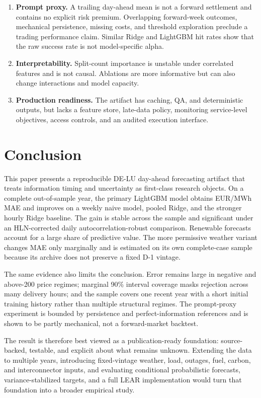 \documentclass[11pt]{article}
\begin{document}
\begin{enumerate}[leftmargin=*,itemsep=5pt]
  \item \textbf{Prompt proxy.}  A trailing day-ahead mean is not a forward
  settlement and contains no explicit risk premium.  Overlapping forward-week
  outcomes, mechanical persistence, missing costs, and threshold exploration
  preclude a trading performance claim. Similar Ridge and LightGBM hit rates
  show that the raw success rate is not model-specific alpha.

  \item \textbf{Interpretability.}  Split-count importance is unstable under
  correlated features and is not causal.  Ablations are more informative but
  can also change interactions and model capacity.

  \item \textbf{Production readiness.}  The artifact has caching, QA, and
  deterministic outputs, but lacks a feature store, late-data policy,
  monitoring service-level objectives, access controls, and an audited
  execution interface.
\end{enumerate}

\section{Conclusion}

This paper presents a reproducible DE-LU day-ahead forecasting artifact that
treats information timing and uncertainty as first-class research objects.
On a complete out-of-sample year, the primary LightGBM model obtains
\PrimaryMAE{} EUR/MWh MAE and improves on a weekly naive model, pooled Ridge,
and the stronger hourly Ridge baseline. The gain is stable across the sample
and significant under an HLN-corrected daily autocorrelation-robust
comparison. Renewable forecasts account for a large share of predictive value.
The more permissive weather variant changes MAE only marginally and is
estimated on its own complete-case sample because its archive does not
preserve a fixed D-1 vintage.

The same evidence also limits the conclusion. Error remains large in negative
and above-200 price regimes; marginal 90\% interval coverage masks rejection
across many delivery hours; and the sample covers one recent year with a short
initial training history rather than multiple structural regimes. The
prompt-proxy experiment is bounded by persistence and perfect-information
references and is shown to be partly mechanical, not a forward-market
backtest.

The result is therefore best viewed as a publication-ready foundation:
source-backed, testable, and explicit about what remains unknown.  Extending
the data to multiple years, introducing fixed-vintage weather, load, outages,
fuel, carbon, and interconnector inputs, and evaluating conditional
probabilistic forecasts, variance-stabilized targets, and a full LEAR
implementation would turn that foundation into a broader empirical study.
\end{document}
